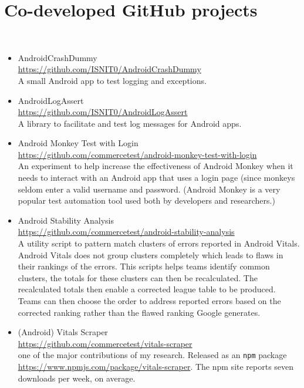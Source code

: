 \section{Co-developed GitHub projects}~\label{subsec:co-developed-github-projects}
\begin{itemize}
    \item AndroidCrashDummy\\ \url{https://github.com/ISNIT0/AndroidCrashDummy}\\ A small Android app to test logging and exceptions.
    
    \item AndroidLogAssert\\ \url{https://github.com/ISNIT0/AndroidLogAssert}\\ A library to facilitate and test log messages for Android apps.
    
    \item Android Monkey Test with Login \\ \url{https://github.com/commercetest/android-monkey-test-with-login}\\ An experiment to help increase the effectiveness of Android Monkey when it needs to interact with an Android app that uses a login page (since monkeys seldom enter a valid username and password. (Android Monkey is a very popular test automation tool used both by developers and researchers.) 
    
    \item Android Stability Analysis\\ \url{https://github.com/commercetest/android-stability-analysis}\\ A utility script to pattern match clusters of errors reported in Android Vitals. Android Vitals does not group clusters completely which leads to flaws in their rankings of the errors. This scripts helps teams identify common clusters, the totals for these clusters can then be recalculated. The recalculated totals then enable a corrected league table to be produced. Teams can then choose the order to address reported errors based on the corrected ranking rather than the flawed ranking Google generates.
    
    \item (Android) Vitals Scraper\\ \url{https://github.com/commercetest/vitals-scraper}\\ one of the major contributions of my research. Released as an \texttt{npm} package \url{https://www.npmjs.com/package/vitals-scraper}. The npm site reports seven downloads per week, on average.
    

\end{itemize}

